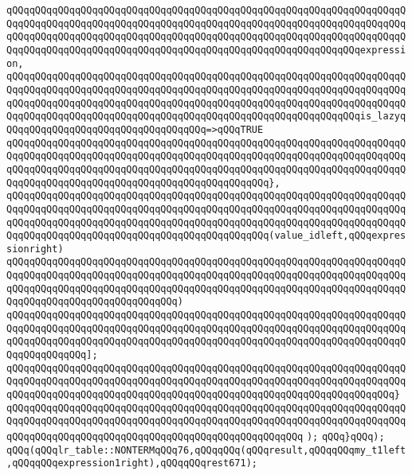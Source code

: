 \verb|qQQqqQQqqQQqqQQqqQQqqQQqqQQqqQQqqQQqqQQqqQQqqQQqqQQqqQQqqQQqqQQqqQQqqQQqqQQqqQQqqQQqqQQqqQQqqQQqqQQqqQQqqQQqqQQqqQQqqQQqqQQqqQQqqQQqqQQqqQQqqQQqqQQqqQQqqQQqqQQqqQQqqQQqqQQqqQQqqQQqqQQqqQQqqQQqqQQqqQQqqQQqqQQqqQQqqQQqqQQqqQQqqQQqqQQqqQQqqQQqqQQqqQQqqQQqqQQqqQQqqQQqqQQqqQQqexpression,|\newline
\verb|qQQqqQQqqQQqqQQqqQQqqQQqqQQqqQQqqQQqqQQqqQQqqQQqqQQqqQQqqQQqqQQqqQQqqQQqqQQqqQQqqQQqqQQqqQQqqQQqqQQqqQQqqQQqqQQqqQQqqQQqqQQqqQQqqQQqqQQqqQQqqQQqqQQqqQQqqQQqqQQqqQQqqQQqqQQqqQQqqQQqqQQqqQQqqQQqqQQqqQQqqQQqqQQqqQQqqQQqqQQqqQQqqQQqqQQqqQQqqQQqqQQqqQQqqQQqqQQqqQQqqQQqqQQqqQQqis_lazyqQQqqQQqqQQqqQQqqQQqqQQqqQQqqQQqqQQq=>qQQqTRUE|\newline
\verb|qQQqqQQqqQQqqQQqqQQqqQQqqQQqqQQqqQQqqQQqqQQqqQQqqQQqqQQqqQQqqQQqqQQqqQQqqQQqqQQqqQQqqQQqqQQqqQQqqQQqqQQqqQQqqQQqqQQqqQQqqQQqqQQqqQQqqQQqqQQqqQQqqQQqqQQqqQQqqQQqqQQqqQQqqQQqqQQqqQQqqQQqqQQqqQQqqQQqqQQqqQQqqQQqqQQqqQQqqQQqqQQqqQQqqQQqqQQqqQQqqQQqqQQqqQQqqQQq},|\newline
\verb|qQQqqQQqqQQqqQQqqQQqqQQqqQQqqQQqqQQqqQQqqQQqqQQqqQQqqQQqqQQqqQQqqQQqqQQqqQQqqQQqqQQqqQQqqQQqqQQqqQQqqQQqqQQqqQQqqQQqqQQqqQQqqQQqqQQqqQQqqQQqqQQqqQQqqQQqqQQqqQQqqQQqqQQqqQQqqQQqqQQqqQQqqQQqqQQqqQQqqQQqqQQqqQQqqQQqqQQqqQQqqQQqqQQqqQQqqQQqqQQqqQQqqQQqqQQqqQQq(value_idleft,qQQqexpressionright)|\newline
\verb|qQQqqQQqqQQqqQQqqQQqqQQqqQQqqQQqqQQqqQQqqQQqqQQqqQQqqQQqqQQqqQQqqQQqqQQqqQQqqQQqqQQqqQQqqQQqqQQqqQQqqQQqqQQqqQQqqQQqqQQqqQQqqQQqqQQqqQQqqQQqqQQqqQQqqQQqqQQqqQQqqQQqqQQqqQQqqQQqqQQqqQQqqQQqqQQqqQQqqQQqqQQqqQQqqQQqqQQqqQQqqQQqqQQqqQQqqQQqqQQq)|\newline
\verb|qQQqqQQqqQQqqQQqqQQqqQQqqQQqqQQqqQQqqQQqqQQqqQQqqQQqqQQqqQQqqQQqqQQqqQQqqQQqqQQqqQQqqQQqqQQqqQQqqQQqqQQqqQQqqQQqqQQqqQQqqQQqqQQqqQQqqQQqqQQqqQQqqQQqqQQqqQQqqQQqqQQqqQQqqQQqqQQqqQQqqQQqqQQqqQQqqQQqqQQqqQQqqQQqqQQqqQQqqQQqqQQq];|\newline
\verb|qQQqqQQqqQQqqQQqqQQqqQQqqQQqqQQqqQQqqQQqqQQqqQQqqQQqqQQqqQQqqQQqqQQqqQQqqQQqqQQqqQQqqQQqqQQqqQQqqQQqqQQqqQQqqQQqqQQqqQQqqQQqqQQqqQQqqQQqqQQqqQQqqQQqqQQqqQQqqQQqqQQqqQQqqQQqqQQqqQQqqQQqqQQqqQQqqQQqqQQqqQQqqQQq}|\newline
\verb|qQQqqQQqqQQqqQQqqQQqqQQqqQQqqQQqqQQqqQQqqQQqqQQqqQQqqQQqqQQqqQQqqQQqqQQqqQQqqQQqqQQqqQQqqQQqqQQqqQQqqQQqqQQqqQQqqQQqqQQqqQQqqQQqqQQqqQQqqQQqqQQqqQQqqQQqqQQqqQQqqQQqqQQqqQQqqQQqqQQqqQQqqQQqqQQq|\newline
\verb|);|\newline
\verb|qQQq}qQQq);|\newline
\verb|qQQq(qQQqlr_table::NONTERMqQQq76,qQQqqQQq(qQQqresult,qQQqqQQqmy_t1left,qQQqqQQqexpression1right),qQQqqQQqrest671);|\newline
